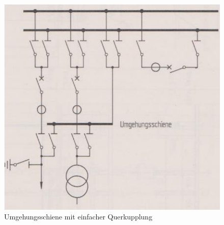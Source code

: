\begin{minipage}[t]{0.65\textwidth}
    \begin{figure}[H]
        \centering
        \includegraphics[width=0.6\linewidth]{./images/10-Schaltanlagen/Umgehungsschiene-mit-Querkupplung.png}
        \caption[Umgehungsschiene mit einfacher Querkupplung]{Umgehungsschiene mit einfacher Querkupplung}
    \end{figure}
\end{minipage}

\newpage


